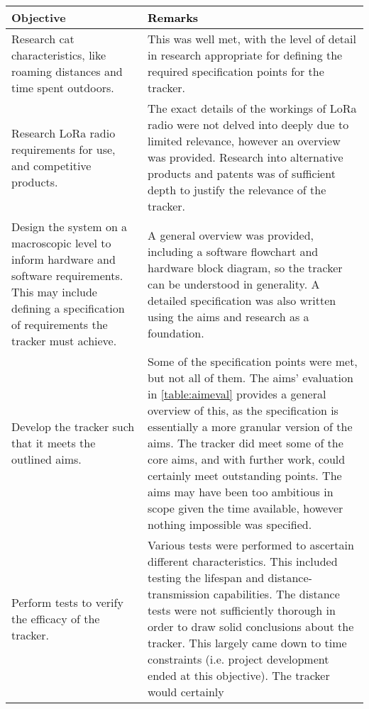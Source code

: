 \documentclass[11pt]{article}
\begin{document}
{\small
\begin{xltabular}{\linewidth}{|>{\raggedright\arraybackslash}p{5cm}|>{\color{white}}Z|}
    \hline
    Objective & \textcolor{black}{Remarks} \\
    \hline
    \endhead
    \endfoot

    \hline
    Research cat characteristics, like roaming distances and time spent outdoors. & This was well met,
        with the level of detail in research appropriate for defining the required specification points for the tracker. \\ \hline
    Research LoRa radio requirements for use, and competitive products. & The exact details of the workings of LoRa 
        radio were not delved into deeply due to limited relevance, however an overview was provided. Research into alternative products and patents 
        was of sufficient depth to justify the relevance of the tracker. \\ \hline
    Design the system on a macroscopic level to inform hardware and software requirements. 
        This may include defining a specification of requirements the tracker must achieve. 
        & A general overview was provided, including a software flowchart and hardware block diagram, so the 
        tracker can be understood in generality. A detailed specification was also written using the aims and research as a foundation. \\ \hline
    Develop the tracker such that it meets the outlined aims. & Some of the specification points were met, but not all of them. 
        The aims' evaluation in \cref{table:aimeval} provides a general overview of this, as the specification is essentially a more granular version of the 
        aims. The tracker did meet some of the core aims, and with further work, could certainly meet outstanding points. The aims may have been 
        too ambitious in scope given the time available, however nothing impossible was specified. \\ \hline
    Perform tests to verify the efficacy of the tracker. & Various tests were performed to ascertain different characteristics.
        This included testing the lifespan and distance-transmission capabilities. The distance tests were not sufficiently thorough 
        in order to draw solid conclusions about the tracker. This largely came down to time constraints (i.e. project development 
        ended at this objective). The tracker would certainly 

\end{xltabular}}
\end{document}
